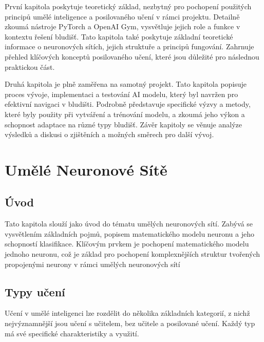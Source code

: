 \documentclass[12pt, a4paper,
twoside,        %
openright
]{report}
\begin{document}
První kapitola poskytuje teoretický základ, nezbytný pro pochopení použitých principů umělé inteligence a posilovaného učení v rámci projektu. Detailně zkoumá nástroje PyTorch a OpenAI Gym, vysvětluje jejich role a funkce v kontextu řešení bludišť. Tato kapitola také poskytuje základní teoretické informace o neuronových sítích, jejich struktuře a principů fungování. Zahrnuje přehled klíčových konceptů posilovaného učení, které jsou důležité pro následnou praktickou část.


Druhá kapitola je plně zaměřena na samotný projekt. Tato kapitola popisuje proces vývoje, implementaci a testování AI modelu, který byl navržen pro efektivní navigaci v bludišti. Podrobně představuje specifické výzvy a metody, které byly použity při vytváření a trénování modelu, a zkoumá jeho výkon a schopnost adaptace na různé typy bludišť. Závěr kapitoly se věnuje analýze výsledků a diskusi o zjištěních a možných směrech pro další vývoj.





\chapter{Umělé Neuronové Sítě}

\section{Úvod}
\label{sec:uvod}

Tato kapitola slouží jako úvod do tématu umělých neuronových sítí. Zabývá se vysvětlením základních pojmů, popisem matematického modelu neuronu a jeho schopností klasifikace. Klíčovým prvkem je pochopení matematického modelu jednoho neuronu, což je základ pro pochopení komplexnějších struktur tvořených propojenými neurony v rámci umělých neuronových sítí



\section{Typy učení}
\label{sec:prace_s_textem}
Učení v umělé inteligenci lze rozdělit do několika základních kategorií, z nichž nejvýznamnější jsou učení s učitelem, bez učitele a posilované učení. Každý typ má své specifické charakteristiky a využití.
\end{document}
